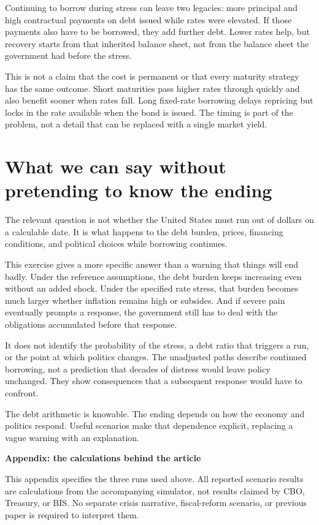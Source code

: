 \documentclass[11pt,letterpaper]{article}
\begin{document}
Continuing to borrow during stress can leave two legacies: more principal and
high contractual payments on debt issued while rates were elevated. If those
payments also have to be borrowed, they add further debt. Lower rates help,
but recovery starts from that inherited balance sheet, not from the balance
sheet the government had before the stress.

This is not a claim that the cost is permanent or that every maturity strategy
has the same outcome. Short maturities pass higher rates through quickly and
also benefit sooner when rates fall. Long fixed-rate borrowing delays repricing
but locks in the rate available when the bond is issued. The timing is part
of the problem, not a detail that can be replaced with a single market yield.

\section*{What we can say without pretending to know the ending}

The relevant question is not whether the United States must run out of
dollars on a calculable date. It is what happens to the debt burden, prices,
financing conditions, and political choices while borrowing continues.

This exercise gives a more specific answer than a warning that things will
end badly. Under the reference assumptions, the debt burden keeps increasing
even without an added shock. Under the specified rate stress, that burden
becomes much larger whether inflation remains high or subsides. And if severe
pain eventually prompts a response, the government still has to deal with the
obligations accumulated before that response.

It does not identify the probability of the stress, a debt ratio that triggers
a run, or the point at which politics changes. The unadjusted paths describe
continued borrowing, not a prediction that decades of distress would leave
policy unchanged. They show consequences that a subsequent response would
have to confront.

The debt arithmetic is knowable. The ending depends on how the economy and
politics respond. Useful scenarios make that dependence explicit, replacing
a vague warning with an explanation.

\clearpage
\appendix
{\Large\bfseries\color{ink} Appendix: the calculations behind the article\par}

This appendix specifies the three runs used above. All reported scenario
results are calculations from the accompanying simulator, not results claimed
by CBO, Treasury, or BIS. No separate crisis narrative, fiscal-reform scenario,
or previous paper is required to interpret them.
\end{document}
